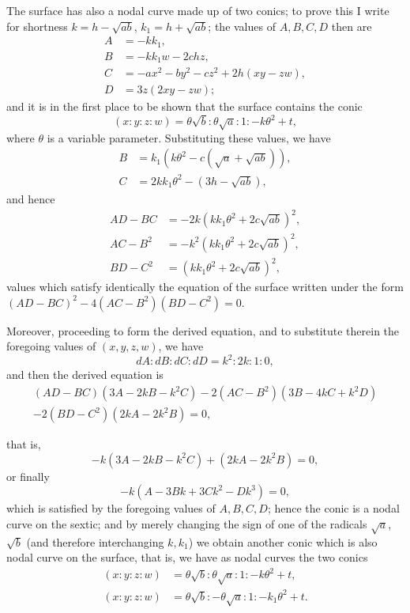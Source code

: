 \documentclass[12pt,a4paper]{article}
\begin{document}
The surface has also a nodal curve made up of two conics; to prove this I write for shortness $k = h - \sqrt{ab}$, $k_1 = h + \sqrt{ab}$; the values of $A, B, C, D$ then are
\begin{align*}
A &= -kk_1,\\
B &= -kk_1 w - 2chz,\\
C &= -ax^2 - by^2 - cz^2 + 2h(xy - zw),\\
D &= 3z(2xy - zw);
\end{align*}
and it is in the first place to be shown that the surface contains the conic
\[
(x : y : z : w) = \theta\sqrt{b} : \theta\sqrt{a} : 1 : -k\theta^2 + t,
\]
where $\theta$ is a variable parameter. Substituting these values, we have
\begin{align*}
B &= k_1(k\theta^2 - c(\sqrt{a} + \sqrt{ab})),\\
C &= 2kk_1\theta^2 - (3h - \sqrt{ab}),
\end{align*}
and hence
\begin{align*}
AD - BC &= -2k(kk_1\theta^2 + 2c\sqrt{ab})^2,\\
AC - B^2 &= -k^2(kk_1\theta^2 + 2c\sqrt{ab})^2,\\
BD - C^2 &= (kk_1\theta^2 + 2c\sqrt{ab})^2,
\end{align*}
values which satisfy identically the equation of the surface written under the form $(AD - BC)^2 - 4(AC - B^2)(BD - C^2) = 0$.

Moreover, proceeding to form the derived equation, and to substitute therein the foregoing values of $(x, y, z, w)$, we have
\[
dA : dB : dC : dD = k^2 : 2k : 1 : 0,
\]
and then the derived equation is
\begin{multline*}
(AD - BC)(3A - 2kB - k^2C) - 2(AC - B^2)(3B - 4kC + k^2D)\\
- 2(BD - C^2)(2kA - 2k^2B) = 0,
\end{multline*}

that is,
\[
-k(3A - 2kB - k^2C) + (2kA - 2k^2B) = 0,
\]
or finally
\[
-k(A - 3Bk + 3Ck^2 - Dk^3) = 0,
\]
which is satisfied by the foregoing values of $A, B, C, D$; hence the conic is a nodal curve on the sextic; and by merely changing the sign of one of the radicals $\sqrt{a}$, $\sqrt{b}$ (and therefore interchanging $k, k_1$) we obtain another conic which is also nodal curve on the surface, that is, we have as nodal curves the two conics
\begin{align*}
(x : y : z : w) &= \theta\sqrt{b} : \theta\sqrt{a} : 1 : -k\theta^2 + t,\\
(x : y : z : w) &= \theta\sqrt{b} : -\theta\sqrt{a} : 1 : -k_1\theta^2 + t.
\end{align*}
\end{document}
